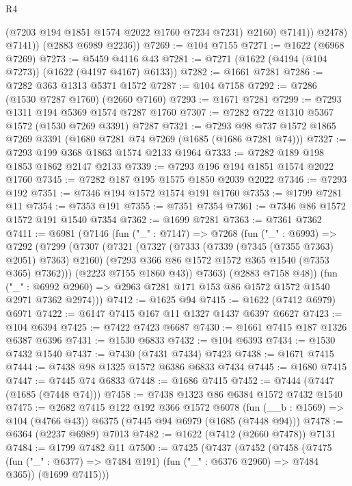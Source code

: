\begin{lexlean}{R4}
\begin{coremodule}
                  (@7203 @194 @1851 @1574 @2022 @1760 @7234 @7231)
                  @2160)
                @7141))
            @2478)
          @7141))
      (@2883 @6989 @2236))
@7269 := @104 @7155
@7271 := @1622 (@6968 @7269)
@7273 := @5459 @4116 @43
@7281 := @7271 (@1622 (@4194 (@104 @7273)) (@1622 (@4197 @4167) @6133))
@7282 := @1661 @7281
@7286 := @7282 @363 @1313 @5371 @1572
@7287 := @104 @7158
@7292 := @7286 (@1530 @7287 @1760) (@2660 @7160)
@7293 := @1671 @7281
@7299 := @7293 @1311 @194 @5369 @1574 @7287 @1760
@7307 := @7282 @722 @1310 @5367 @1572 (@1530 @7269 @3391) @7287
@7321 := @7293 @98 @737 @1572 @1865 @7269 @3391 (@1680 @7281 @74 @7269 (@1685 (@1686 @7281 @74)))
@7327 := @7293 @199 @368 @1863 @1574 @2133 @1964
@7333 := @7282 @189 @198 @1853 @1862 @2147 @2133
@7339 := @7293 @196 @194 @1851 @1574 @2022 @1760
@7345 := @7282 @187 @195 @1575 @1850 @2039 @2022
@7346 := @7293 @192
@7351 := @7346 @194 @1572 @1574 @191 @1760
@7353 := @1799 @7281 @11
@7354 := @7353 @191
@7355 := @7351 @7354
@7361 := @7346 @86 @1572 @1572 @191 @1540 @7354
@7362 := @1699 @7281
@7363 := @7361 @7362
@7411 := @6981
    (@7146
      (fun ("_" : @7147) =>
      @7268
        (fun ("_" : @6993) =>
        @7292
          (@7299
            (@7307
              (@7321
                (@7327
                  (@7333 (@7339 (@7345 (@7355 @7363) @2051) @7363) @2160)
                  (@7293 @366 @86 @1572 @1572 @365 @1540 (@7353 @365) @7362)))
              (@2223 @7155 @1860 @43))
            @7363)
          (@2883 @7158 @48))
        (fun ("_" : @6992 @2960) => @2963 @7281 @171 @153 @86 @1572 @1572 @1540 @2971 @7362 @2974)))
@7412 := @1625 @94
@7415 := @1622 (@7412 @6979) @6971
@7422 := @6147 @7415 @167 @11 @1327 @1437 @6397 @6627
@7423 := @104 @6394
@7425 := @7422 @7423 @6687
@7430 := @1661 @7415 @187 @1326 @6387 @6396
@7431 := @1530 @6833
@7432 := @104 @6393
@7434 := @1530 @7432 @1540
@7437 := @7430 (@7431 @7434) @7423
@7438 := @1671 @7415
@7444 := @7438 @98 @1325 @1572 @6386 @6833 @7434
@7445 := @1680 @7415
@7447 := @7445 @74 @6833
@7448 := @1686 @7415
@7452 := @7444 (@7447 (@1685 (@7448 @74)))
@7458 := @7438 @1323 @86 @6384 @1572 @7432 @1540
@7475 := @2682
    @7415
    @122
    @192
    @366
    @1572
    @6078
    (fun (__b : @1569) => @104 (@4766 @43))
    @6375
    (@7445 @94 @6979 (@1685 (@7448 @94)))
@7478 := @6364 (@2237 @6989) @7013
@7482 := @1622 (@7412 (@2660 @7478)) @7131
@7484 := @1799 @7482 @11
@7500 := @7425
    (@7437
      (@7452
        (@7458
          (@7475 (fun ("_" : @6377) => @7484 @191) (fun ("_" : @6376 @2960) => @7484 @365))
          (@1699 @7415)))

\end{coremodule}
\end{lexlean}
